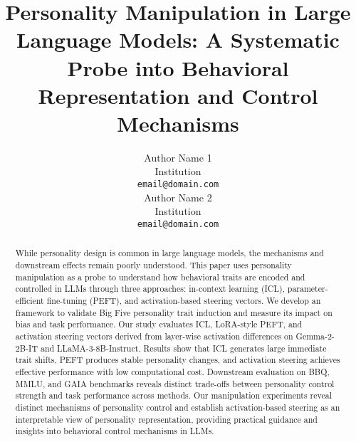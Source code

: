 \documentclass[11pt]{article}
\title{Personality Manipulation in Large Language Models: A Systematic Probe into Behavioral Representation and Control Mechanisms}
\author{Author Name 1 \\
  Institution \\
  \texttt{email@domain.com} \\\And
  Author Name 2 \\
  Institution \\
  \texttt{email@domain.com} \\}
\begin{document}
\maketitle
\begin{abstract}
While personality design is common in large language models, the mechanisms and downstream effects remain poorly understood. This paper uses personality manipulation as a probe to understand how behavioral traits are encoded and controlled in LLMs through three approaches: in-context learning (ICL), parameter-efficient fine-tuning (PEFT), and activation-based steering vectors. We develop an framework to validate Big Five personality trait induction and measure its impact on bias and task performance. Our study evaluates ICL, LoRA-style PEFT, and activation steering vectors derived from layer-wise activation differences on Gemma-2-2B-IT and LLaMA-3-8B-Instruct. Results show that ICL generates large immediate trait shifts, PEFT produces stable personality changes, and activation steering achieves effective performance with low computational cost. Downstream evaluation on BBQ, MMLU, and GAIA benchmarks reveals distinct trade-offs between personality control strength and task performance across methods. Our manipulation experiments reveal distinct mechanisms of personality control and establish activation-based steering as an interpretable view of personality representation, providing practical guidance and insights into behavioral control mechanisms in LLMs.
\end{abstract}






\appendix













\end{document}
